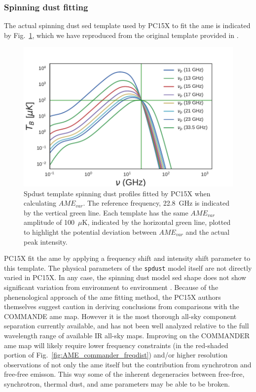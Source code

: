         \subsubsection{Spinning dust fitting}
          The actual spinning dust \acrshort{sed} template used by PC15X to fit the \acrshort{ame} is indicated by Fig.~\ref{fig:AME_commander_freqshift_templ}, which we have reproduced from the original template provided in \cite{ali-haimoud09}.
              \begin{figure}
                \includegraphics[width=\textwidth]{../Plots/ch_datasources/AME_commander_freqshift_templ.pdf}
                \centering
                \caption{Spdust template spinning dust profiles fitted by PC15X when calculating $AME_{var}$.  The reference frequency, 22.8~GHz is indicated by the vertical green line. Each template has the same $AME_{var}$ amplitude of 100~$\mu$K, indicated by the horizontal green line, plotted to highlight the potential deviation between $AME_{var}$ and the actual peak intensity. }
                \label{fig:AME_commander_freqshift_templ}
              \end{figure}
          PC15X fit the \acrshort{ame} by applying a frequency shift and intensity shift parameter to this template. The physical parameters of the {\tt spdust} model itself are not directly varied in PC15X. In any case, the spinning dust model \acrshort{sed} shape does not show significant variation from environment to environment \citep{ali-haimoud09}.
         Because of the phenenological approach of the \acrshort{ame} fitting method, the PC15X authors themselves suggest caution in deriving conclusions from comparisons with the COMMANDE \acrshort{ame} map. However it is the most thorough all-sky component separation currently available, and has not been well analyzed relative to the full wavelength range of available IR all-sky maps. Improving on the COMMANDER \acrshort{ame} map will likely require lower frequency constraints (in the red-shaded portion of Fig.~\ref{fig:AME_commander_freqdist}) and/or higher resolution observations of not only the \acrshort{ame} itself but the contribution from synchrotron and free-free emisson. This way some of the inherent degeneracies between free-free, synchrotron, thermal dust, and \acrshort{ame} parameters may be able to be broken.


